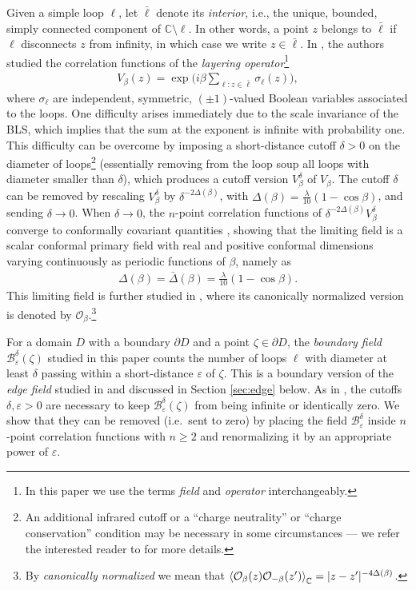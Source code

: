 \documentclass[a4paper,11pt]{article}
\begin{document}
Given a simple loop $\ell$, let $\bar\ell$ denote its \emph{interior}, i.e., the unique, bounded, simply connected component of $\mathbb{C} \setminus \ell$. In other words, a point $z$ belongs to $\bar\ell$ if $\ell$ disconnects $z$ from infinity, in which case we write $z \in \bar\ell$. In \cite{Camia_2016}, the authors studied the correlation functions of the \emph{layering operator}\footnote{In this paper we  use the terms \emph{field} and \emph{operator} interchangeably.}
\begin{align}
    V_{\beta}(z)=\exp\Big({i\beta\sum_{\ell: z \in \bar\ell} \sigma_{\ell}}(z)\Big),
\end{align}
where $\sigma_{\ell}$ are independent, symmetric, $(\pm 1)$-valued Boolean variables associated to the loops. One difficulty arises immediately due to the scale invariance of the BLS, which implies that the sum at the exponent is infinite with probability one. This difficulty can be overcome by imposing a short-distance cutoff $\delta>0$ 
on the diameter of loops\footnote{An additional infrared cutoff or a ``charge neutrality'' or ``charge conservation'' condition may be necessary in some circumstances --- we refer the interested reader to \cite{Camia_2016} for more details.} (essentially removing from the loop soup all loops with diameter smaller than $\delta$), which produces a cutoff version $V^{\delta}_{\beta}$ of $V_{\beta}$. The cutoff $\delta$ can be removed by rescaling $V^{\delta}_{\beta}$ by $\delta^{-2\Delta(\beta)}$, with $\Delta(\beta) = \frac{\lambda}{10}(1-\cos\beta)$, and sending $\delta \to 0$. When $\delta \to 0$, the $n$-point correlation functions of $\delta^{-2\Delta(\beta)}V^{\delta}_{\beta}$ converge to conformally covariant quantities \cite{Camia_2016}, showing that the limiting field is a scalar conformal primary field with real and positive conformal dimensions varying continuously as periodic functions of $\beta$, namely as
\begin{align}
    \Delta(\beta) = \bar \Delta(\beta) = \frac{\lambda}{10}(1-\cos\beta).
\end{align}
This limiting field is further studied in \cite{Camia_2020}, where its canonically normalized version is denoted by $\mathcal{O}_{\beta}$.\footnote{By \emph{canonically normalized} we mean that $\Braket{\mathcal{O}_{\beta}(z) \mathcal{O}_{-\beta}(z')}_{\mathbb C} = |z-z'|^{-4\Delta(\beta)}$.}

For a domain $D$ with a boundary $\partial D$ and a point $\zeta \in \partial D$, the \emph{boundary field} $\mathcal{B}^{\delta}_{\varepsilon}(\zeta)$ studied in this paper counts the number of loops $\ell$ with diameter at least $\delta$ passing within a short-distance $\varepsilon$ of $\zeta$. This is a boundary version of the \emph{edge field} studied in \cite{camia2021scalar} and discussed in Section \ref{sec:edge} below. As in \cite{camia2021scalar}, the cutoffs $\delta,\varepsilon>0$ are necessary to keep $\mathcal{B}^{\delta}_{\varepsilon}(\zeta)$ from being infinite or identically zero.
We show that they can be removed (i.e.\ sent to zero) by placing the field $\mathcal{B}^{\delta}_{\varepsilon}$ inside $n$-point correlation functions with $n \geq 2$ and renormalizing it by an appropriate power of $\varepsilon$.
\end{document}
